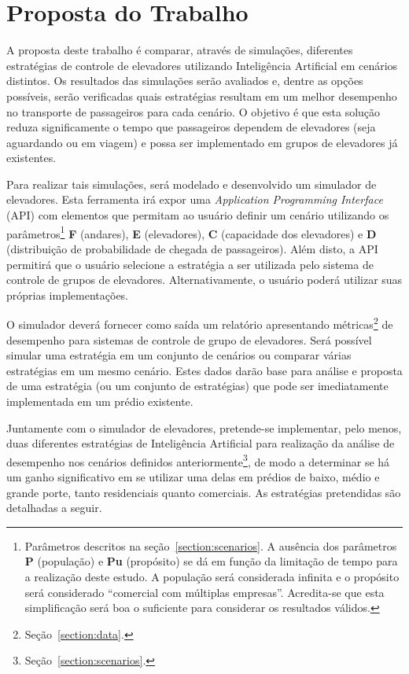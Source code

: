\chapter{\label{chap:proposal}Proposta do Trabalho}

A proposta deste trabalho é comparar, através de simulações, diferentes
estratégias de controle de elevadores utilizando Inteligência Artificial em
cenários distintos. Os resultados das simulações serão avaliados e, dentre as
opções possíveis, serão verificadas quais estratégias resultam em um melhor
desempenho no transporte de passageiros para cada cenário. O objetivo é que esta
solução reduza significamente o tempo que passageiros dependem de elevadores
(seja aguardando ou em viagem) e possa ser implementado em grupos de elevadores
já existentes.

Para realizar tais simulações, será modelado e desenvolvido um simulador de
elevadores. Esta ferramenta irá expor uma \textit{Application Programming
Interface} (API) com elementos que permitam ao usuário definir um cenário
utilizando os parâmetros\footnote{Parâmetros descritos na
seção~\ref{section:scenarios}. A ausência dos parâmetros \textbf{P} (população)
e \textbf{Pu} (propósito) se dá em função da limitação de tempo para a
realização deste estudo. A população será considerada infinita e o propósito
será considerado ``comercial com múltiplas empresas''. Acredita-se que esta
simplificação será boa o suficiente para considerar os resultados válidos.}
\textbf{F} (andares), \textbf{E} (elevadores), \textbf{C} (capacidade dos
elevadores) e \textbf{D} (distribuição de probabilidade de chegada de
passageiros). Além disto, a API permitirá que o usuário selecione a estratégia a
ser utilizada pelo sistema de controle de grupos de elevadores.
Alternativamente, o usuário poderá utilizar suas próprias implementações.

O simulador deverá fornecer como saída um relatório apresentando
métricas\footnote{Seção~\ref{section:data}.} de desempenho para sistemas de
controle de grupo de elevadores. Será possível simular uma estratégia em um
conjunto de cenários ou comparar várias estratégias em um mesmo cenário. Estes
dados darão base para análise e proposta de uma estratégia (ou um conjunto de
estratégias) que pode ser imediatamente implementada em um prédio existente.

Juntamente com o simulador de elevadores, pretende-se implementar, pelo menos,
duas diferentes estratégias de Inteligência Artificial para realização da
análise de desempenho nos cenários definidos
anteriormente\footnote{Seção~\ref{section:scenarios}.}, de modo a determinar se
há um ganho significativo em se utilizar uma delas em prédios de baixo, médio e
grande porte, tanto residenciais quanto comerciais. As estratégias pretendidas
são detalhadas a seguir.

